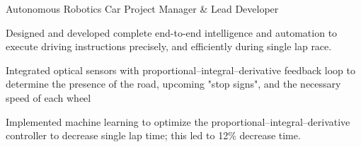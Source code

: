 \begin{cventries}




  \cventry
    {} %
    {Autonomous Robotics Car} %
    {Project Manager \& Lead Developer}
    {}
    {
    \begin{cvitems} %
        \item {Designed and developed complete end-to-end intelligence and automation to execute driving instructions precisely, and efficiently during single lap race.}
         \item {Integrated optical sensors with proportional–integral–derivative  feedback loop to determine the presence of the road, upcoming "stop signs", and the necessary speed of each wheel}
         \item {Implemented machine learning to optimize the proportional–integral–derivative controller to decrease single lap time; this led to 12\% decrease time.}
      \end{cvitems}
    }

\end{cventries}
